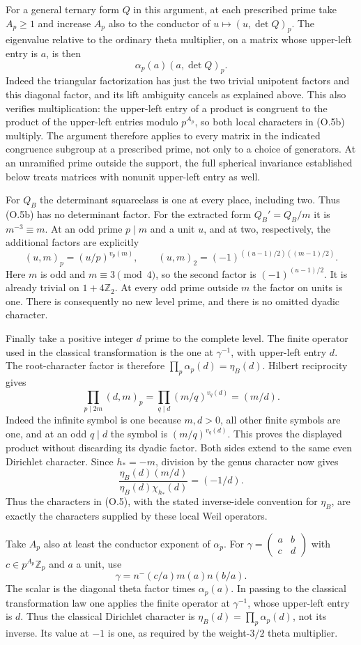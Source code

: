 For a general ternary form $Q$ in this argument, at each prescribed
prime take $A_p\ge1$ and increase $A_p$
also to the conductor of $u\mapsto(u,\det Q)_p$. The eigenvalue
relative to the ordinary theta multiplier, on a matrix whose
upper-left entry is $a$, is then
\[
                    \alpha_p(a)(a,\det Q)_p.                  \tag{O.5b}
\]
Indeed the triangular factorization has just the two trivial
unipotent factors and this diagonal factor, and its lift ambiguity
cancels as explained above. This also verifies multiplication:
the upper-left entry of a product is congruent to the product
of the upper-left entries modulo $p^{A_p}$, so both local
characters in (O.5b) multiply. The argument therefore applies
to every matrix in the indicated congruence subgroup at a prescribed
prime, not only to a choice of generators. At an unramified prime
outside the support, the full spherical invariance established
below treats matrices with nonunit upper-left entry as well.

For $Q_B$ the determinant squareclass is one at every place,
including two. Thus (O.5b) has no determinant factor. For the
extracted form $Q_B'=Q_B/m$ it is $m^{-3}\equiv m$.
At an odd prime $p\mid m$ and a unit $u$, and at two, respectively,
the additional factors are explicitly
\[
 (u,m)_p=(u/p)^{v_p(m)},\qquad
 (u,m)_2=(-1)^{((u-1)/2)((m-1)/2)}.
\]
Here $m$ is odd and $m\equiv3\pmod4$, so the second factor is
$(-1)^{(u-1)/2}$. It is already trivial on $1+4\mathbb Z_2$.
At every odd prime outside $m$ the factor on units is one. There
is consequently no new level prime, and there is no omitted
dyadic character.

Finally take a positive integer $d$ prime to the complete level.
The finite operator used in the classical transformation is the
one at $\gamma^{-1}$, with upper-left entry $d$. The root-character
factor is therefore $\prod_p\alpha_p(d)=\eta_B(d)$.
Hilbert reciprocity gives
\[
 \prod_{p\mid 2m}(d,m)_p
   =\prod_{q\mid d}(m/q)^{v_q(d)}=(m/d).                       \tag{O.5c}
\]
Indeed the infinite symbol is one because $m,d>0$, all other
finite symbols are one, and at an odd $q\mid d$ the symbol is
$(m/q)^{v_q(d)}$. This proves the displayed product without
discarding its dyadic factor. Both sides extend to the same
even Dirichlet character. Since $h_*=-m$, division by the genus
character now gives
\[
 \frac{\eta_B(d)(m/d)}{\eta_B(d)\chi_{h_*}(d)}=(-1/d).
\]
Thus the characters in (O.5), with the stated inverse-idele
convention for $\eta_B$, are exactly the characters supplied
by these local Weil operators.

Take $A_p$ also at least the conductor exponent of $\alpha_p$.
For $\gamma=\left(\begin{smallmatrix}a&b\\c&d\end{smallmatrix}\right)$
with $c\in p^{A_p}\mathbb Z_p$ and $a$ a unit, use
\[
 \gamma=n^-(c/a)m(a)n(b/a).
\]
The scalar is the diagonal theta factor times $\alpha_p(a)$.
In passing to the classical transformation law one applies the
finite operator at $\gamma^{-1}$, whose upper-left entry is $d$.
Thus the classical Dirichlet character is
$\eta_B(d)=\prod_p\alpha_p(d)$, not its inverse.  Its value at
$-1$ is one, as required by the weight-$3/2$ theta multiplier.

